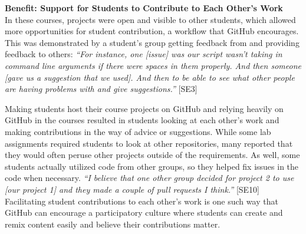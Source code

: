 


\textbf{Benefit: Support for Students to Contribute to Each Other's Work} \\
In these courses, projects were open and visible to other students, which allowed more opportunities for student contribution, a workflow that GitHub encourages. This was demonstrated by a student's group getting feedback from and providing feedback to others: \textit{``For instance, one [issue] was our script wasn't taking in command line arguments if there were spaces in them properly. And then someone [gave us a suggestion that we used]. And then to be able to see what other people are having problems with and give suggestions.''} [SE3]

Making students host their course projects on GitHub and relying heavily on GitHub in the courses resulted in students looking at each other's work and making contributions in the way of advice or suggestions. While some lab assignments required students to look at other repositories, many reported that they would often peruse other projects outside of the requirements. As well, some students actually utilized code from other groups, so they helped fix issues in the code when necessary. \textit{``I believe that one other group decided for project 2 to use [our project 1] and they made a couple of pull requests I think.''} [SE10] Facilitating student contributions to each other's work is one such way that GitHub can encourage a participatory culture \cite{jenkins2009confronting} where students can create and remix content easily and believe their contributions matter.

